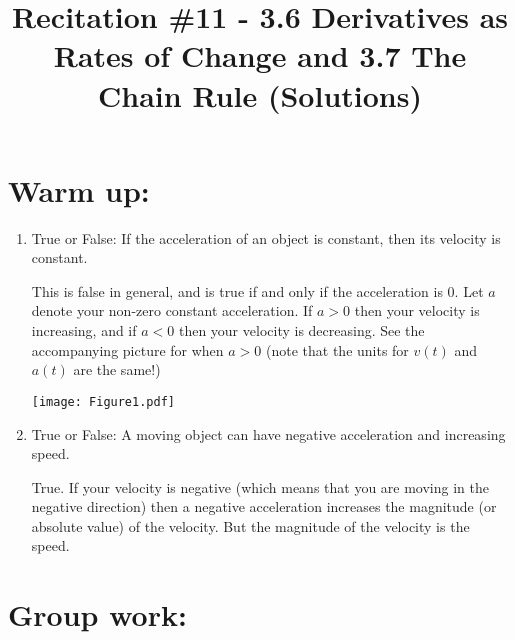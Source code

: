 \documentclass[nooutcomes]{ximera}
\title{Recitation \#11 - 3.6 Derivatives as Rates of Change and 3.7 The Chain Rule (Solutions)}
\begin{document}
\begin{abstract}		\end{abstract}
\maketitle

\section*{Warm up:} 

	\begin{enumerate}
	
	\item  True or False:  If the acceleration of an object is constant, then its velocity is constant.

		\begin{freeResponse}
		This is false in general, and is true if and only if the acceleration is 0.  Let $a$ denote your non-zero constant acceleration.  If $a > 0$ then your velocity is increasing, and if $a < 0$ then your velocity is decreasing.  See the accompanying picture for when $a>0$ (note that the units for $v(t)$ and $a(t)$ are  the same!)
		
			\begin{image}
			\texttt{[image: Figure1.pdf]}
			\end{image}
		\end{freeResponse}	
		
		
	
	\item  True or False:  A moving object can have negative acceleration and increasing speed.

		\begin{freeResponse}
		True.  If your velocity is negative (which means that you are moving in the negative direction) then a negative acceleration increases the magnitude (or absolute value) of the velocity.  But the magnitude of the velocity is the speed.
		\end{freeResponse}	
		
		
		
	\end{enumerate}

	
	
	
	
	

\section*{Group work:}
\end{document}
